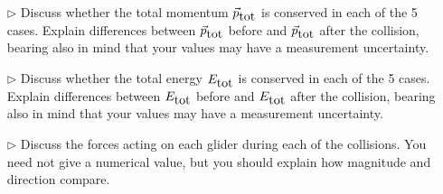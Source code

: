 \begin{itemize}
\item[$\triangleright$] Discuss whether the total momentum $\vec{p}_{\mbox{\mbox{tot}}}$ is conserved in each of the 5 cases. Explain differences between $\vec{p}_{\mbox{\mbox{tot}}}$ before and $\vec{p}_{\mbox{\mbox{tot}}}$ after the collision, bearing also in mind that your values may have a measurement uncertainty.
\item[$\triangleright$] Discuss whether the total energy $E_{\mbox{\mbox{tot}}}$ is conserved in each of the 5 cases. Explain differences between $E_{\mbox{\mbox{tot}}}$ before and $E_{\mbox{\mbox{tot}}}$ after the collision, bearing also in mind that your values may have a measurement uncertainty.
\item[$\triangleright$] Discuss the forces acting on each glider during each of the collisions. You need not give a numerical value, but you should explain how magnitude and direction compare.
\end{itemize}
